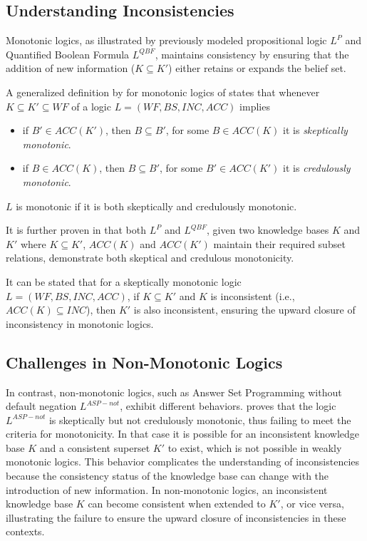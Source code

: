 \subsection{Understanding Inconsistencies}
Monotonic logics, as illustrated by previously modeled propositional logic \(L^P\) and Quantified Boolean Formula \(L^{QBF}\), maintains consistency by ensuring that the addition of new information (\(K \subseteq K'\)) either retains or expands the belief set.

A generalized definition by \cite{brewka_strong_2019} for monotonic logics of \cite{brewka_equilibria_2007} states that whenever \(K \subseteq K' \subseteq WF\) of a logic \(L = (WF, BS, INC, ACC)\) implies
\begin{itemize}
      \item if \(B' \in ACC(K')\), then \(B \subseteq B'\), for some \(B \in ACC(K)\) it is \textit{skeptically monotonic}.
      \item if \(B \in ACC(K)\), then \(B \subseteq B'\), for some \(B' \in ACC(K')\) it is \textit{credulously monotonic}.
\end{itemize}
\(L\) is monotonic if it is both skeptically and credulously monotonic.

It is further proven in \cite{brewka_strong_2019} that both \(L^P\) and \(L^{QBF}\), given two knowledge bases \(K\) and \(K'\) where \(K \subseteq K'\), \(ACC(K)\) and \(ACC(K')\) maintain their required subset relations, demonstrate both skeptical and credulous monotonicity.

It can be stated that for a skeptically monotonic logic \(L=(WF, BS, INC, ACC)\), if \(K \subseteq K'\) and \(K\) is inconsistent (i.e., \(ACC(K) \subseteq INC\)), then \(K'\) is also inconsistent, ensuring the upward closure of inconsistency in monotonic logics.

\subsection{Challenges in Non-Monotonic Logics}
In contrast, non-monotonic logics, such as Answer Set Programming without default negation \(L^{ASP-not}\), exhibit different behaviors.
\cite{brewka_strong_2019} proves that the logic \(L^{ASP-not}\) is skeptically but not credulously monotonic, thus failing to meet the criteria for monotonicity.
In that case it is possible for an inconsistent knowledge base \(K\) and a consistent superset \(K'\) to exist, which is not possible in weakly monotonic logics.
This behavior complicates the understanding of inconsistencies because the consistency status of the knowledge base can change with the introduction of new information.
In non-monotonic logics, an inconsistent knowledge base \(K\) can become consistent when extended to \(K'\), or vice versa, illustrating the failure to ensure the upward closure of inconsistencies in these contexts.

